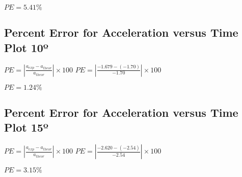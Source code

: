\documentclass{article}
\begin{document}
$PE = 5.41 \%$
\subsection{Percent Error for Acceleration versus Time Plot 10º}
$PE = \left |\frac{a_{exp}-a_{theor}}{a_{theor}} \right | \times 100 $
\newline
\newline
$PE = \left |\frac{-1.679-(-1.70)}{-1.70} \right | \times 100 $
\newline
\newline



$PE = 1.24 \%$
\subsection{Percent Error for Acceleration versus Time Plot 15º}
$PE = \left |\frac{a_{exp}-a_{theor}}{a_{theor}} \right | \times 100 $
\newline
\newline
$PE = \left |\frac{-2.620-(-2.54)}{-2.54} \right | \times 100 $
\newline
\newline



$PE = 3.15 \%$
\end{document}
